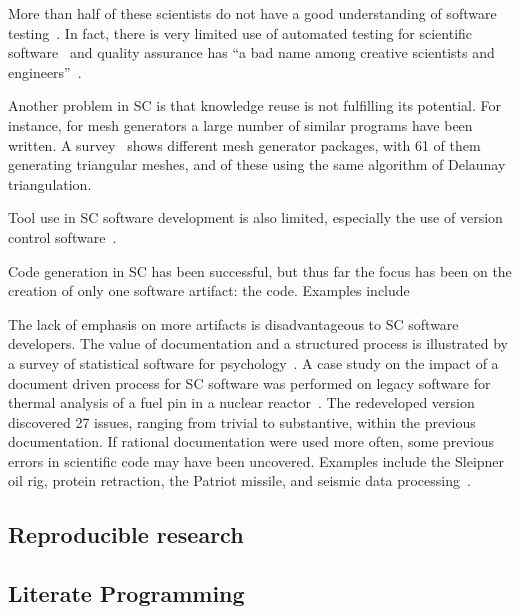 \documentclass[preprint, 10pt]{sigplanconf}
\begin{document}
More than half of these scientists do not have a good understanding of software
testing~\cite{Merali2010}. In fact, there is very limited use of automated
testing for scientific software~\cite{PatrickAndGilligan2016} and quality
assurance has ``a bad name among creative scientists and
engineers''~\cite[p.~352]{Roache1998}.

Another problem in SC is that knowledge reuse is not fulfilling its potential.
For instance, for mesh generators a large number of similar programs have been
written. A survey~\cite{Owen1998} shows %
different mesh generator packages,
with 61 of them generating triangular meshes, and %
of these using the same algorithm of Delaunay triangulation.

Tool use in SC software development is also limited, especially the use of
version control software~\cite{Wilson2006}.

Code generation in SC has been successful, but thus far the focus has been on
the creation of only one software artifact: the code. Examples include

The lack of emphasis on more artifacts is disadvantageous to SC software
developers. The value of documentation and a structured process is illustrated
by a survey of statistical software for
psychology~\cite{SmithEtAl2015-SS-TR,SmithEtAl2015SQJ}. A case study on the
impact of a document driven process for SC software was performed on legacy
software for thermal analysis of a fuel pin in a nuclear
reactor~\cite{SmithAndKoothoor2016, SmithEtAl2013}. The redeveloped version
discovered 27 issues, ranging from trivial to substantive, within the previous
documentation. If rational documentation were used more often, some previous
errors in scientific code may have been uncovered. Examples include the Sleipner
oil rig, protein retraction, the Patriot missile, and seismic data
processing~\cite{HattonAndRoberts1994}.

\subsection{Reproducible research} %
\label{subsec:rr}

\subsection{Literate Programming}
\label{subsec:lp}
\end{document}

